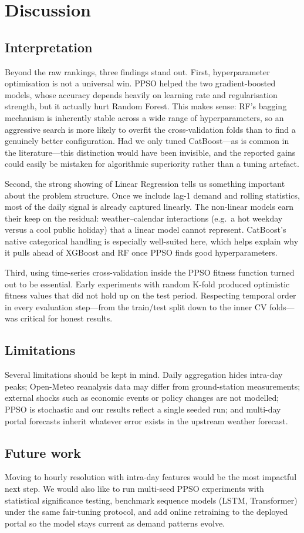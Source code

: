 \section{Discussion}\label{sec:discussion}

\subsection{Interpretation}
Beyond the raw rankings, three findings stand out. First, hyperparameter optimisation is not a universal win. PPSO helped the two gradient-boosted models, whose accuracy depends heavily on learning rate and regularisation strength, but it actually hurt Random Forest. This makes sense: RF's bagging mechanism is inherently stable across a wide range of hyperparameters, so an aggressive search is more likely to overfit the cross-validation folds than to find a genuinely better configuration. Had we only tuned CatBoost---as is common in the literature---this distinction would have been invisible, and the reported gains could easily be mistaken for algorithmic superiority rather than a tuning artefact.

Second, the strong showing of Linear Regression tells us something important about the problem structure. Once we include lag-1 demand and rolling statistics, most of the daily signal is already captured linearly. The non-linear models earn their keep on the residual: weather--calendar interactions (e.g.\ a hot weekday versus a cool public holiday) that a linear model cannot represent. CatBoost's native categorical handling is especially well-suited here, which helps explain why it pulls ahead of XGBoost and RF once PPSO finds good hyperparameters.

Third, using time-series cross-validation inside the PPSO fitness function turned out to be essential. Early experiments with random K-fold produced optimistic fitness values that did not hold up on the test period. Respecting temporal order in every evaluation step---from the train/test split down to the inner CV folds---was critical for honest results.

\subsection{Limitations}
Several limitations should be kept in mind. Daily aggregation hides intra-day peaks; Open-Meteo reanalysis data may differ from ground-station measurements; external shocks such as economic events or policy changes are not modelled; PPSO is stochastic and our results reflect a single seeded run; and multi-day portal forecasts inherit whatever error exists in the upstream weather forecast.

\subsection{Future work}
Moving to hourly resolution with intra-day features would be the most impactful next step. We would also like to run multi-seed PPSO experiments with statistical significance testing, benchmark sequence models (LSTM, Transformer) under the same fair-tuning protocol, and add online retraining to the deployed portal so the model stays current as demand patterns evolve.
